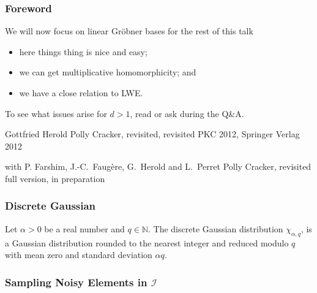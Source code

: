 \documentclass[10pt]{beamer}
\newcommand{\Sample}{\mathbf{Sample}}
\newcommand{\sample}{{\;{{\leftarrow}_\$}\;}}
\newcommand{\I}{\ensuremath{\mathcal{I}}\xspace}
\begin{document}
\begin{frame}
\frametitle{Foreword} 

We will now focus on linear Gröbner bases for the rest of this talk
\begin{itemize}
 \item here things thing is nice and easy;
 \item we can get multiplicative homomorphicity; and
 \item we have a close relation to LWE.
\end{itemize}

To see what issues arise for $d>1$, read \cite{Gottfried, Journal} or ask during the Q\&A.

\begin{thebibliography}{foobar}
Gottfried Herold
\newblock Polly Cracker, revisited, revisited
\newblock PKC 2012, Springer Verlag 2012

with P. Farshim, J.-C.\ Faugère, G.\ Herold and L.\ Perret
\newblock Polly Cracker, revisited
\newblock full version, in preparation

\end{thebibliography}


\end{frame}


\begin{frame}
\frametitle{Discrete Gaussian}

\begin{definition}
Let $\alpha > 0$ be a real number and $q \in \mathbb{N}$. The discrete Gaussian distribution $\chi_{\alpha, q}$, is a Gaussian distribution rounded to the nearest integer and reduced modulo $q$ with mean zero and standard deviation $\alpha q$.
\end{definition}

\end{frame}

\begin{frame}
\frametitle{Sampling Noisy Elements in $\I$} 

\begin{center}
\begin{minipage}{0.5\textwidth}
\begin{algorithm}[H]
\Begin{
 $f \sample P_{\leq b}$\;
 $f \gets f - (f \mod G)$\;
 {\color{pink} $e \sample \chi$;}\\
 \Return{$f + e$}\;
}
\caption{$\Sample()$}
\end{algorithm}
\end{minipage}
\end{center}

\end{frame}
\end{document}
